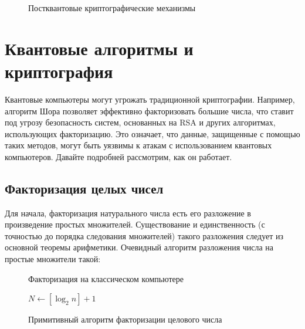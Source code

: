\documentclass[12pt]{article}
\begin{document}
\begin{figure}[h]
\caption{Постквантовые криптографические механизмы}
\label{fig:post-mechs}
\end{figure}

\section{Квантовые алгоритмы и криптография}

Квантовые компьютеры могут угрожать традиционной криптографии. Например, алгоритм Шора позволяет эффективно факторизовать большие числа, что ставит под угрозу безопасность систем, основанных на RSA и других алгоритмах, использующих факторизацию. Это означает, что данные, защищенные с помощью таких методов, могут быть уязвимы к атакам с использованием квантовых компьютеров. Давайте подробней рассмотрим, как он работает.

\newpage

\subsection{Факторизация целых чисел}

Для начала, факторизация натурального числа есть его разложение в произведение простых множителей. Существование и единственность (с точностью до порядка следования множителей) такого разложения следует из основной теоремы арифметики. Очевидный алгоритм разложения числа на простые множители такой:

\begin{figure}[h]
    \centering
    \begin{algorithm}[H]
    \caption{Факторизация на классическом компьютере}
    \State $ N \gets [\log_{2} n] + 1 $
    
    \end{algorithm}
    \caption{Примитивный алгоритм факторизации целового числа}
    \label{fig:algo1}
\end{figure}
\end{document}
